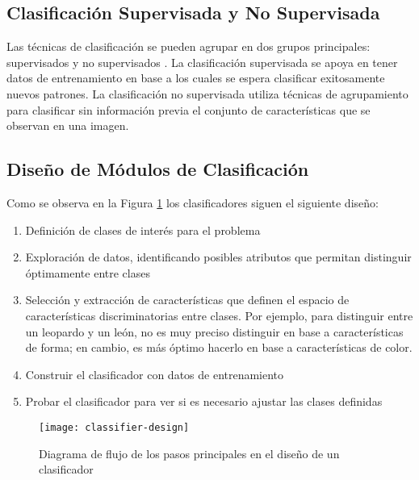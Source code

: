 \subsection{Clasificación Supervisada y No Supervisada}
Las técnicas de clasificación se pueden agrupar en dos grupos principales: supervisados y no supervisados \cite{Solomon2011-xz}. 
La clasificación supervisada se apoya en tener datos de entrenamiento en base a los cuales se espera clasificar exitosamente nuevos patrones.
La clasificación no supervisada utiliza técnicas de agrupamiento para clasificar sin información previa el conjunto de características que se observan en una imagen. 

\subsection{Diseño de Módulos de Clasificación }

Como se observa en la Figura \ref{fig:classifier-design} los clasificadores siguen el siguiente diseño: 
\begin{enumerate}
    \item Definición de clases de interés para el problema
\item Exploración de datos, identificando posibles atributos que permitan distinguir óptimamente entre clases
\item Selección y extracción de características que definen el espacio de características discriminatorias entre clases. Por ejemplo, para distinguir entre un leopardo y un león, no es muy preciso distinguir en base a características de forma; en cambio, es más óptimo hacerlo en base a características de color.
\item Construir el clasificador con datos de entrenamiento
\item Probar el clasificador para ver si es necesario ajustar las clases definidas
\end{enumerate}

    \begin{figure}[H]
        \centering
        \texttt{[image: classifier-design]}
        \caption{Diagrama de flujo de los pasos principales en el diseño de un clasificador \protect\cite{Solomon2011-xz}}
        \label{fig:classifier-design}
    \end{figure}
    

